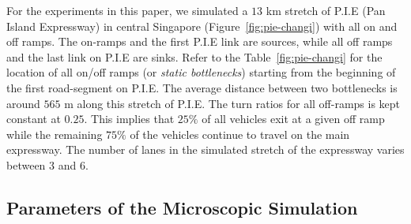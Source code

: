 \documentclass{wscpaperproc}
\theoremstyle{wsc}
\begin{document}
For the experiments in this paper, we simulated a $13$ km stretch of P.I.E (Pan Island Expressway) in central Singapore (Figure~\ref{fig:pie-changi}) with all on and off ramps. The on-ramps and the first P.I.E link are sources, while all off ramps and the last link on P.I.E are sinks. Refer to the Table~\ref{fig:pie-changi} for the location of all on/off ramps (or {\it static bottlenecks}) starting from the beginning of the first road-segment on P.I.E. The average distance between two bottlenecks is around $565$ m along this stretch of P.I.E. The turn ratios for all off-ramps is kept constant at $0.25$. This implies that $25\%$ of all vehicles exit at a given off ramp while the remaining $75\%$ of the vehicles continue to travel on the main expressway. The number of lanes in the simulated stretch of the expressway varies between $3$ and $6$.



\subsection{Parameters of the Microscopic Simulation}
\end{document}
